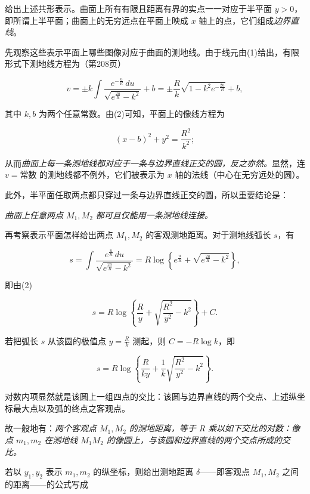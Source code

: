 给出上述共形表示。曲面上所有有限且距离有界的实点一一对应于半平面 $y>0$，即所谓上半平面；曲面上的无穷远点在平面上映成 $x$ 轴上的点，它们组成\emph{边界直线}。



先观察这些表示平面上哪些图像对应于曲面的测地线。由于线元由(1)给出，有限形式下测地线方程为（第208页）

\[
 v=\pm k\int \frac{e^{-\frac{u}{R}}\,du}{\sqrt{e^{\frac{2u}{R}}-k^2}}+b
=\pm\frac{R}{k}\sqrt{1-k^2e^{-\frac{2u}{R}}}+b,
\]

其中 $k,b$ 为两个任意常数。由(2)可知，平面上的像线方程为

\[
\tag{3}
 (x-b)^2+y^2=\frac{R^2}{k^2};
\]

从而\emph{曲面上每一条测地线都对应于一条与边界直线正交的圆，反之亦然。}显然，连 $v=\text{常数}$ 的测地线都不例外，它们被表示为 $x$ 轴的法线（中心在无穷远处的圆）。



此外，半平面任取两点都只穿过一条与边界直线正交的圆，所以重要结论是：

\emph{曲面上任意两点 $M_1,M_2$ 都可且仅能用一条测地线连接。}



再考察表示平面怎样给出两点 \(M_1,M_2\) 的客观测地距离。对于测地线弧长 \(s\)，有

\[
 s=\int\frac{e^{\frac{u}{R}}\,du}{\sqrt{e^{\frac{2u}{R}}-k^2}}
 =R\log\left\{e^{\frac{u}{R}}+\sqrt{e^{\frac{2u}{R}}-k^2}\right\},
\]

即由(2)

\[
 s=R\log\left\{\frac Ry+\sqrt{\frac{R^2}{y^2}-k^2}\right\}+C.
\]

若把弧长 $s$ 从该圆的极值点 $y=\frac Rk$ 测起，则 $C=-R\log k$，即

\[
 s=R\log\left\{\frac R{ky}+\frac1k\sqrt{\frac{R^2}{y^2}-k^2}\right\}.
\]

对数内项显然就是该圆上一组四点的交比：该圆与边界直线的两个交点、上述纵坐标最大点以及弧的终点之客观点。



故一般地有：\emph{两个客观点 \(M_1,M_2\) 的测地距离，等于 R 乘以如下交比的对数：像点 \(m_1,m_2\) 在测地线 \(M_1M_2\) 的像圆上，与该圆和边界直线的两个交点所成的交比。}



若以 \(y_1,y_2\) 表示 \(m_1,m_2\) 的纵坐标，则给出测地距离 \(\delta\)——即客观点 \(M_1,M_2\) 之间的距离——的公式写成


